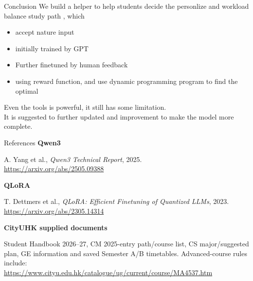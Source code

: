\documentclass[aspectratio=169,11pt]{beamer}
\begin{document}
\begin{frame}{Conclusion}
We build a helper to help students decide the personlize and workload balance study path , which
\begin{itemize}
    \item  accept nature input
    \item initially trained by GPT
    \item Further finetuned by human feedback
    \item using reward function, and use dynamic programming program to find the optimal
\end{itemize}
Even the tools is powerful, it still has some limitation.\\
It is suggested to further updated and improvement to make the model more complete.

\end{frame}

\begin{frame}{References}
\small
\textbf{Qwen3}\par
A. Yang et al., \emph{Qwen3 Technical Report}, 2025.\\
\url{https://arxiv.org/abs/2505.09388}\par
\vspace{3mm}
\textbf{QLoRA}\par
T. Dettmers et al., \emph{QLoRA: Efficient Finetuning of Quantized LLMs}, 2023.\\
\url{https://arxiv.org/abs/2305.14314}\par
\vspace{3mm}
\textbf{CityUHK supplied documents}\par
Student Handbook 2026--27, CM 2025-entry path/course list, CS major/suggested plan, GE information and saved Semester A/B timetables. Advanced-course rules include:\\
\url{https://www.cityu.edu.hk/catalogue/ug/current/course/MA4537.htm}
\end{frame}
\end{document}
